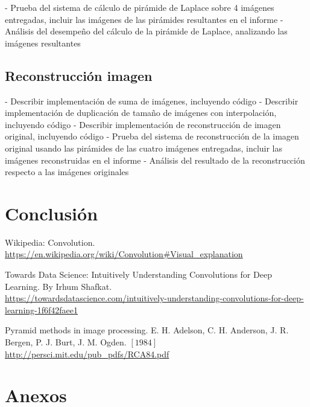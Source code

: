 \documentclass[12pt, letterpaper]{article}
\begin{document}
\newpage
- Prueba del sistema de cálculo de pirámide de Laplace sobre 4 imágenes entregadas, incluir las
imágenes de las pirámides resultantes en el informe
- Análisis del desempeño del cálculo de la pirámide de Laplace, analizando las imágenes resultantes


\subsection{Reconstrucción imagen}
- Describir implementación de suma de imágenes, incluyendo código
- Describir implementación de duplicación de tamaño de imágenes con interpolación, incluyendo
código
- Describir implementación de reconstrucción de imagen original, incluyendo código
- Prueba del sistema de reconstrucción de la imagen original usando las pirámides de las cuatro
imágenes entregadas, incluir las imágenes reconstruidas en el informe
- Análisis del resultado de la reconstrucción respecto a las imágenes originales


\section{Conclusión}


\newpage
\begin{thebibliography}{X}
     Wikipedia: Convolution. \\
    \url{https://en.wikipedia.org/wiki/Convolution#Visual_explanation} 

     Towards Data Science: Intuitively Understanding Convolutions for Deep Learning. By Irhum Shafkat. \\
    \url{https://towardsdatascience.com/intuitively-understanding-convolutions-for-deep-learning-1f6f42faee1} 

     Pyramid methods in image processing. E. H. Adelson, C. H. Anderson,  J. R. Bergen,  P. J. Burt,  J. M. Ogden. $[1984]$
    \url{http://persci.mit.edu/pub_pdfs/RCA84.pdf}

\end{thebibliography}

\section{Anexos}
\end{document}
